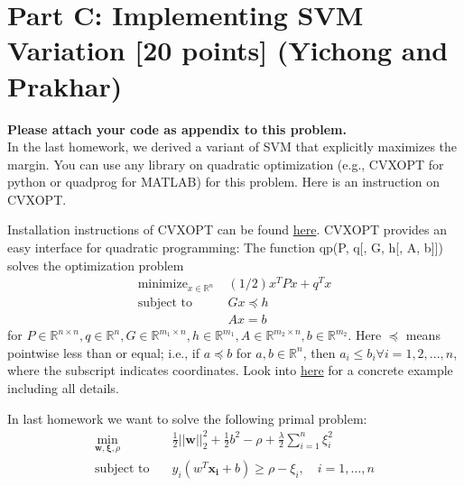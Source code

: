 \newpage

\section*{Part C: Implementing SVM Variation [20 points] (Yichong and Prakhar) }
\textbf{Please attach your code as appendix to this problem.}\\
In the last homework, we derived a variant of SVM that explicitly maximizes the margin.
You can use any library on quadratic optimization (e.g., CVXOPT for python or \textsf{quadprog} for MATLAB) for this problem. Here is an instruction on CVXOPT.

Installation instructions of CVXOPT can be found \href{http://cvxopt.org/install/index.html}{here}. CVXOPT provides an easy interface for quadratic programming: The function \textsf{qp(P, q[, G, h[, A, b]])} solves the optimization problem
\begin{align*}
\text{minimize}_{x \in \mathbb{R}^n}\;  & (1/2) x^TPx+q^Tx \\
\text{subject to } & Gx \preceq h \\
& Ax=b
\end{align*}
for $P\in \mathbb{R}^{n\times n}, q\in \mathbb{R}^n, G\in \mathbb{R}^{m_1\times n}, h \in \mathbb{R}^{m_1}, A \in \mathbb{R}^{m_2\times n}, b \in \mathbb{R}^{m_2}$.
Here $\preceq$ means pointwise less than or equal; i.e., if $a \preceq b $ for $a,b \in \mathbb{R}^n$, then $a_i\leq b_i \forall i=1,2,...,n$, where the subscript indicates coordinates. Look into \href{http://cvxopt.org/examples/tutorial/qp.html}{here} for a concrete example including all details.

In last homework we want to solve the following primal problem:
\begin{align}
\min_{\boldsymbol{w}, \boldsymbol{\xi}, \rho}&\quad \frac{1}{2} {\boldsymbol{||w||}}_2^2 + \frac{1}{2}b^2- \rho + \frac{\lambda}{2} \sum_{i=1}^n \xi_i^2\label{eqn:primal}\\
\text{subject to} &\quad y_i(w^T \boldsymbol{x_i} + b) \ge \rho - \xi_i,\quad i = 1,\dotsc,n 	\nonumber
\end{align}


